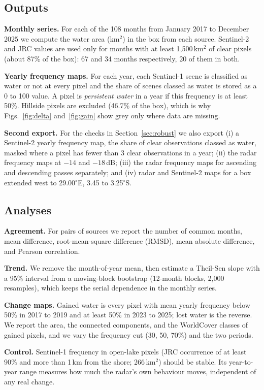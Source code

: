 \documentclass[conference]{IEEEtran}
\begin{document}
\subsection{Outputs}
\textbf{Monthly series.} For each of the 108 months from January 2017 to December 2025 we compute the water area (km$^2$) in the box from each source. Sentinel-2 and JRC values are used only for months with at least 1{,}500\,km$^2$ of clear pixels (about 87\% of the box): 67 and 34 months respectively, 20 of them in both.

\textbf{Yearly frequency maps.} For each year, each Sentinel-1 scene is classified as water or not at every pixel and the share of scenes classed as water is stored as a 0 to 100 value. A pixel is \emph{persistent water} in a year if this frequency is at least 50\%. Hillside pixels are excluded (46.7\% of the box), which is why Figs.~\ref{fig:delta} and~\ref{fig:gain} show grey only where data are missing.

\textbf{Second export.} For the checks in Section~\ref{sec:robust} we also export (i) a Sentinel-2 yearly frequency map, the share of clear observations classed as water, masked where a pixel has fewer than 3 clear observations in a year; (ii) the radar frequency maps at $-14$ and $-18$\,dB; (iii) the radar frequency maps for ascending and descending passes separately; and (iv) radar and Sentinel-2 maps for a box extended west to 29.00$^\circ$E, 3.45 to 3.25$^\circ$S.

\subsection{Analyses}
\textbf{Agreement.} For pairs of sources we report the number of common months, mean difference, root-mean-square difference (RMSD), mean absolute difference, and Pearson correlation.

\textbf{Trend.} We remove the month-of-year mean, then estimate a Theil-Sen slope \cite{sen1968slope} with a 95\% interval from a moving-block bootstrap (12-month blocks, 2{,}000 resamples), which keeps the serial dependence in the monthly series.

\textbf{Change maps.} Gained water is every pixel with mean yearly frequency below 50\% in 2017 to 2019 and at least 50\% in 2023 to 2025; lost water is the reverse. We report the area, the connected components, and the WorldCover classes of gained pixels, and we vary the frequency cut (30, 50, 70\%) and the two periods.

\textbf{Control.} Sentinel-1 frequency in open-lake pixels (JRC occurrence of at least 90\% and more than 1\,km from the shore; 266\,km$^2$) should be stable. Its year-to-year range measures how much the radar's own behaviour moves, independent of any real change.
\end{document}
